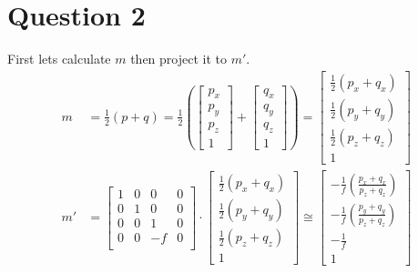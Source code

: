 \documentclass{article} %
\begin{document}

\section{Question 2}
First lets calculate $m$ then project it to $m'$.
\begin{align*}
m &= \frac{1}{2} \left(p+q\right)=\frac{1}{2}\left(
\left[
\begin{matrix}
p_x\\
p_y\\
p_z\\
1
\end{matrix}
\right]
+
\left[
\begin{matrix}
q_x\\
q_y\\
q_z\\
1
\end{matrix}
\right]
\right)
= \left[\begin{matrix}
\frac{1}{2}(p_x + q_x)\\
\frac{1}{2}(p_y + q_y)\\
\frac{1}{2}(p_z + q_z)\\
1
\end{matrix}
\right]\\
m' &= 
\left[
\begin{matrix}
1 & 0 & 0 & 0\\
0 & 1 & 0 & 0\\
0 & 0 & 1 & 0\\
0 & 0 & -f & 0\\
\end{matrix}
\right]
\cdot
\left[\begin{matrix}
\frac{1}{2}(p_x + q_x)\\
\frac{1}{2}(p_y + q_y)\\
\frac{1}{2}(p_z + q_z)\\
1
\end{matrix}
\right]
\cong \left[\begin{matrix}
-\frac{1}{f}\left(\frac{p_x + q_x}{p_z + q_z}\right)\\
-\frac{1}{f}\left(\frac{p_y + q_y}{p_z + q_z}\right)\\
-\frac{1}{f}\\
1
\end{matrix}
\right]
\end{align*}
\end{document}

